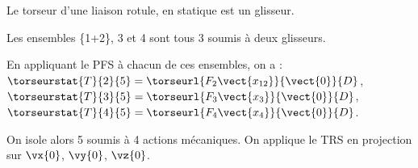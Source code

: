 \ifprof
\begin{corrige}
Le torseur d'une liaison rotule, en statique est un glisseur. 

Les ensembles \{1+2\}, 3 et 4 sont tous 3 soumis à deux glisseurs. 

En appliquant le PFS à chacun de ces ensembles, on a : 
$\torseurstat{T}{2}{5} = \torseurl{F_2\vect{x_{12}}}{\vect{0}}{D}$,
$\torseurstat{T}{3}{5} = \torseurl{F_3\vect{x_3}}{\vect{0}}{D}$,
$\torseurstat{T}{4}{5} = \torseurl{F_4\vect{x_4}}{\vect{0}}{D}$.

On isole alors 5 soumis à 4 actions mécaniques. 
On applique le TRS en projection sur $\vx{0}$, $\vy{0}$, $\vz{0}$. 
\end{corrige}
\else
\fi


